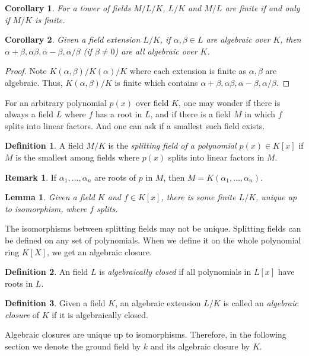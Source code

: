 \documentclass[12pt]{article}
\newtheorem{lemma}{Lemma}[subsection]
\newtheorem{corollary}{Corollary}[subsection]
\theoremstyle{remark}
\theoremstyle{definition}
\newtheorem{remark}{Remark}[subsection]
\newtheorem{definition}{Definition}[subsection]
\begin{document}
        \begin{corollary}\label{corollary-tower-fin-fin}
            For a tower of fields $M/L/K$, $L/K$ and $M/L$ are finite if and only if $M/K$ is finite.
        \end{corollary}
        
        \begin{corollary}
            Given a field extension $L/K$, if $\alpha, \beta \in L$ are algebraic over $K$, then $\alpha + \beta, \alpha \beta, \alpha - \beta, \alpha/\beta$ (if $\beta \neq 0$) are all algebraic over $K$. 
        \end{corollary}
        \begin{proof}
            Note $K(\alpha, \beta)/K(\alpha)/K$ where each extension is finite as      $\alpha, \beta$ are algebraic. Thus, $K(\alpha, \beta)/K$ is finite which contains $\alpha + \beta, \alpha \beta, \alpha - \beta, \alpha/\beta$.
        \end{proof}
        
        For an arbitrary polynomial $p(x)$ over field $K$, one may wonder if there is always a field $L$ where $f$ has a root in $L$, and if there is a field $M$ in which $f$ splits into linear factors. And one can ask if a smallest such field exists.
        \begin{definition}%
            A field $M/K$ is the \textit{splitting field of a polynomial $p(x)\in K[x]$} if $M$ is the smallest among fields where $p(x)$ splits into linear factors in $M$.
        \end{definition}
        \begin{remark}
            If $\alpha_1,\dots,\alpha_n$ are roots of $p$ in $M$, then $M=K(\alpha_1,\dots,\alpha_n)$.
        \end{remark}
        
        \begin{lemma}%
            Given a field $K$ and $f\in K[x]$, there is some finite $L/K$, unique up to isomorphism, where $f$ splits.
        \end{lemma}
        \noindent The isomorphisms between splitting fields may not be unique. Splitting fields can be defined on any set of polynomials. When we define it on the whole polynomial ring $K[X]$, we get an algebraic closure.
        \begin{definition}
            An field $L$ is \textit{algebraically closed} if all polynomials in $L[x]$ have roots in $L$. 
        \end{definition}
        \begin{definition}%
            Given a field $K$, an algebraic extension $L/K$ is called an \textit{algebraic closure} of $K$ if it is algebraically closed.
        \end{definition}
        \noindent Algebraic closures are unique up to isomorphisms. Therefore, in the following section we denote the ground field by $k$ and its algebraic closure by $K$.
        
\end{document}
